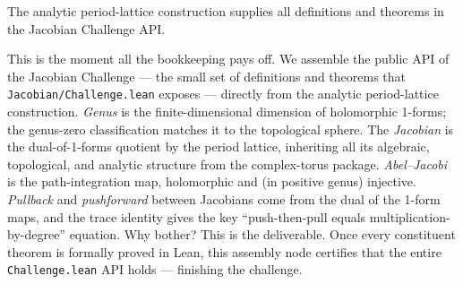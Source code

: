 \begin{theorem}
\label{thm:challenge-api}
The analytic period-lattice construction supplies all definitions and theorems
in the Jacobian Challenge API.
\leanok
\end{theorem}

\begin{layman}
This is the moment all the bookkeeping pays off. We assemble the public
API of the Jacobian Challenge --- the small set of definitions and
theorems that \texttt{Jacobian/Challenge.lean} exposes --- directly from
the analytic period-lattice construction. \emph{Genus} is the
finite-dimensional dimension of holomorphic 1-forms; the genus-zero
classification matches it to the topological sphere. The
\emph{Jacobian} is the dual-of-1-forms quotient by the period lattice,
inheriting all its algebraic, topological, and analytic structure from
the complex-torus package. \emph{Abel--Jacobi} is the path-integration
map, holomorphic and (in positive genus) injective. \emph{Pullback}
and \emph{pushforward} between Jacobians come from the dual of the
1-form maps, and the trace identity gives the key
``push-then-pull equals multiplication-by-degree'' equation. Why
bother? This is the deliverable. Once every constituent theorem is
formally proved in Lean, this assembly node certifies that the entire
\texttt{Challenge.lean} API holds --- finishing the challenge.
\end{layman}


